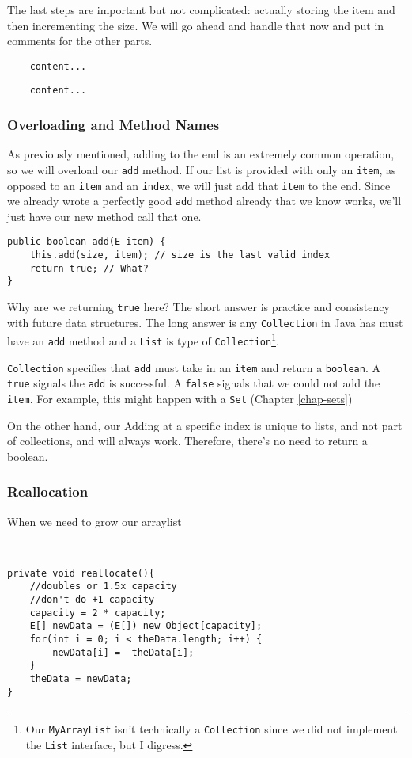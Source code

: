 The last steps are important but not complicated: actually storing the item and then incrementing the size.
We will go ahead and handle that now and put in comments for the other parts.

\begin{verbatim}
	content...
\end{verbatim}

\begin{verbatim}
	content...
\end{verbatim}


\subsubsection{Overloading and Method Names}



As previously  mentioned, adding to the end is an extremely common operation, so we will overload our \texttt{add} method.
If our list is provided with only an \texttt{item}, as opposed to an \texttt{item} and an \texttt{index}, we will just add that \texttt{item} to the end.
Since we already wrote a perfectly good \texttt{add} method already that we know works, we'll just have our new method call that one.
\begin{verbatim}
public boolean add(E item) {
	this.add(size, item); // size is the last valid index
	return true; // What?
}
\end{verbatim}

Why are we returning \texttt{true} here?
The short answer is practice and consistency with future data structures.
The long answer is any \texttt{Collection} in Java has must have an \texttt{add} method and a \texttt{List} is type of \texttt{Collection}\footnote{Our \texttt{MyArrayList} isn't technically a \texttt{Collection} since we did not implement the \texttt{List} interface, but I digress.}.

\texttt{Collection} specifies that \texttt{add} must take in an \texttt{item} and return a \texttt{boolean}.
A \texttt{true} signals the \texttt{add} is successful.
A \texttt{false} signals that we could not add the \texttt{item}.
For example, this might happen with a \texttt{Set} (Chapter \ref{chap-sets})


On the other hand, our Adding at a specific index is unique to lists, and not part of collections,  and will always work. Therefore, there's no need to return a boolean. 

\subsubsection{Reallocation}
\label{arraylist-reallocate}
When we need to grow our arraylist
\begin{verbatim}


private void reallocate(){
	//doubles or 1.5x capacity
	//don't do +1 capacity
	capacity = 2 * capacity;
	E[] newData = (E[]) new Object[capacity];
	for(int i = 0; i < theData.length; i++) {
		newData[i] =  theData[i];
	}
	theData = newData;
}
\end{verbatim}

